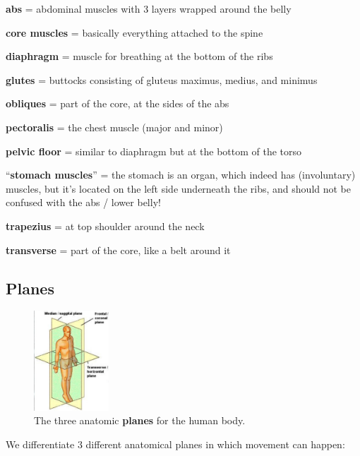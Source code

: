 \begin{itemize*}
    \item \textbf{abs} = abdominal muscles with 3 layers wrapped around the belly
    \item \textbf{core muscles} = basically everything attached to the spine
    \item \textbf{diaphragm} = muscle for breathing at the bottom of the ribs
    \item \textbf{glutes} = buttocks consisting of gluteus maximus, medius, and minimus
    \item \textbf{obliques} = part of the core, at the sides of the abs
    \item \textbf{pectoralis} = the chest muscle (major and minor)
    \item \textbf{pelvic floor} = similar to diaphragm but at the bottom of the torso
    \item ``\textbf{stomach muscles}'' = the stomach is an organ, which indeed has (involuntary) muscles, but it's located on the left side underneath the ribs, and should not be confused with the abs / lower belly!
    \item \textbf{trapezius} = at top shoulder around the neck
    \item \textbf{transverse} = part of the core, like a belt around it
\end{itemize*}

\subsection{Planes}\label{subsec:planes}

\begin{figure}
    \centering
    \includegraphics[width=0.25\textwidth]{images/anatomy_planes}
    \caption{The three anatomic \textbf{planes} for the human body.}
\end{figure}

We differentiate 3 different anatomical planes in which movement can happen:

